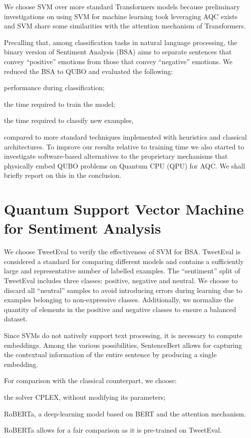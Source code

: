 \documentclass{ceurart}
\begin{document}
We choose SVM\cite{SVM} over more standard Transformers models because preliminary investigations on using SVM for machine learning took leveraging AQC exists\cite{QSVM} and SVM share some similarities with the attention mechanism of Transformers\cite{TransformerSVM}.

Precalling that, among classification tasks in natural language processing, the binary version of Sentiment Analysis (BSA) aims to separate sentences that convey ``positive'' emotions from those that convey ``negative'' emotions. We reduced the BSA to QUBO and evaluated the following:
\begin{enumerate*}[label=\arabic*)]
    \item performance during classification;
    \item the time required to train the model;
    \item the time required to classify new examples,
\end{enumerate*}
compared to more standard techniques implemented with heuristics and classical architectures. To improve our results relative to training time we also started to investigate software-based alternatives to the proprietary mechanisms that physically embed QUBO problems on Quantum CPU (QPU) for AQC. We shall briefly report on this in the conclusion.

\section{Quantum Support Vector Machine for Sentiment Analysis}

We choose TweetEval\cite{TweetEval} to verify the effectiveness of SVM for BSA. TweetEval is considered a standard for comparing different models and contains a sufficiently large and representative number of labelled examples. The ``sentiment'' split of TweetEval includes three classes: positive, negative and neutral. We choose to discard all ``neutral'' samples to avoid introducing errors during learning due to examples belonging to non-expressive classes. Additionally, we normalize the quantity of elements in the positive and negative classes to ensure a balanced dataset.

Since SVMs do not natively support text processing, it is necessary to compute embeddings. Among the various possibilities, SentenceBert\cite{SentenceBert} allows for capturing the contextual information of the entire sentence by producing a single embedding.

For comparison with the classical counterpart, we choose:
\begin{enumerate*}[label=\arabic*)]
    \item the solver CPLEX\cite{cplex}, without modifying its parameters;
    \item RoBERTa\cite{ROBERTA}, a deep-learning model based on BERT\cite{BERT} and the attention mechanism\cite{Attention}.
\end{enumerate*}
RoBERTa allows for a fair comparison as it is pre-trained on TweetEval.
\end{document}
